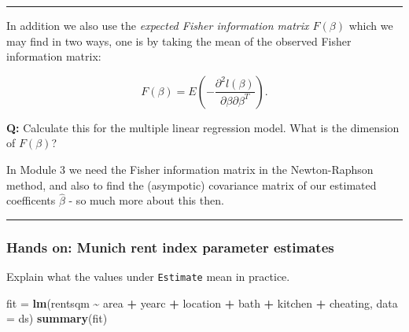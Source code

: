 \documentclass[
]{article}
\newenvironment{Shaded}{\begin{snugshade}}{\end{snugshade}}
\newcommand{\AttributeTok}[1]{\textcolor[rgb]{0.13,0.29,0.53}{#1}}
\newcommand{\FunctionTok}[1]{\textcolor[rgb]{0.13,0.29,0.53}{\textbf{#1}}}
\newcommand{\NormalTok}[1]{#1}
\newcommand{\OtherTok}[1]{\textcolor[rgb]{0.56,0.35,0.01}{#1}}
\newcommand{\SpecialCharTok}[1]{\textcolor[rgb]{0.81,0.36,0.00}{\textbf{#1}}}
\begin{document}
\begin{center}\rule{0.5\linewidth}{0.5pt}\end{center}

In addition we also use the \emph{expected Fisher information matrix
\(F(\beta)\)} which we may find in two ways, one is by taking the mean
of the observed Fisher information matrix:

\[F(\beta) = E\left( -\frac{\partial^2l(\beta)}{\partial\beta\partial\beta^T} \right).\]

\textbf{Q:} Calculate this for the multiple linear regression model.
What is the dimension of \(F(\beta)\)?

In Module 3 we need the Fisher information matrix in the Newton-Raphson
method, and also to find the (asympotic) covariance matrix of our
estimated coefficents \(\hat{\beta}\) - so much more about this then.

\begin{center}\rule{0.5\linewidth}{0.5pt}\end{center}

\hypertarget{hands-on-munich-rent-index-parameter-estimates}{%
\subsubsection{Hands on: Munich rent index parameter
estimates}\label{hands-on-munich-rent-index-parameter-estimates}}

Explain what the values under \texttt{Estimate} mean in practice.

\begin{Shaded}
\begin{Highlighting}[]
\NormalTok{fit }\OtherTok{=} \FunctionTok{lm}\NormalTok{(rentsqm }\SpecialCharTok{\textasciitilde{}}\NormalTok{ area }\SpecialCharTok{+}\NormalTok{ yearc }\SpecialCharTok{+}\NormalTok{ location }\SpecialCharTok{+}\NormalTok{ bath }\SpecialCharTok{+}\NormalTok{ kitchen }\SpecialCharTok{+}\NormalTok{ cheating,}
    \AttributeTok{data =}\NormalTok{ ds)}
\FunctionTok{summary}\NormalTok{(fit)}
\end{Highlighting}
\end{Shaded}
\end{document}
